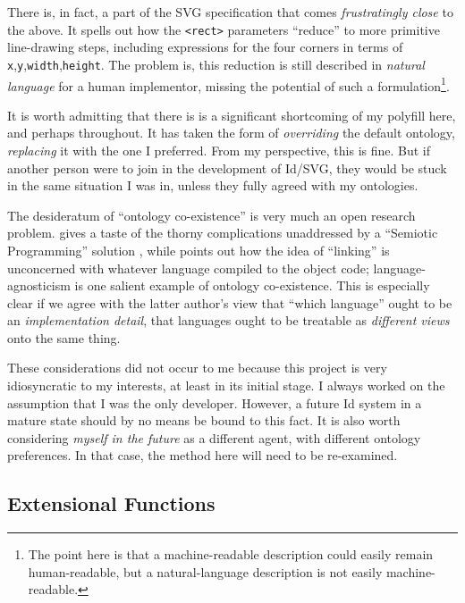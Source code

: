 There is, in fact, a part of the SVG specification \cite{svg-rect} that
comes \emph{frustratingly close} to the above. It spells out how the
\texttt{\textless{}rect\textgreater{}} parameters ``reduce'' to more
primitive line-drawing steps, including expressions for the four corners
in terms of \texttt{x},\texttt{y},\texttt{width},\texttt{height}{}. The
problem is, this reduction is still described in \emph{natural language}
for a human implementor, missing the potential of such a
formulation\footnote{The point here is that a machine-readable
  description could easily remain human-readable, but a natural-language
  description is not easily machine-readable.}.

It is worth admitting that there is is a significant shortcoming of my
polyfill here, and perhaps throughout. It has taken the form of
\emph{overriding} the default ontology, \emph{replacing} it with the one
I preferred. From my perspective, this is fine. But if another person
were to join in the development of Id{}/SVG, they would be stuck in the
same situation I was in, unless they fully agreed with my ontologies.

The desideratum of ``ontology co-existence'' is very much an open
research problem. \cite{crit-semprola} gives a taste of the thorny
complications unaddressed by a ``Semiotic Programming'' solution
\cite{semprola}, while \cite{kell-c} points out how the idea of
``linking'' is unconcerned with whatever language compiled to the object
code; language-agnosticism is one salient example of ontology
co-existence. This is especially clear if we agree with the latter
author's view that ``which language'' ought to be an
\emph{implementation detail}, that languages ought to be treatable as
\emph{different views} onto the same thing.

These considerations did not occur to me because this project is very
idiosyncratic to my interests, at least in its initial stage. I always
worked on the assumption that I was the only developer. However, a
future Id{} system in a mature state should by no means be bound to this
fact. It is also worth considering \emph{myself in the future} as a
different agent, with different ontology preferences. In that case, the
method here will need to be re-examined.

\hypertarget{extensional-functions}{%
\subsection{Extensional Functions}\label{extensional-functions}}

